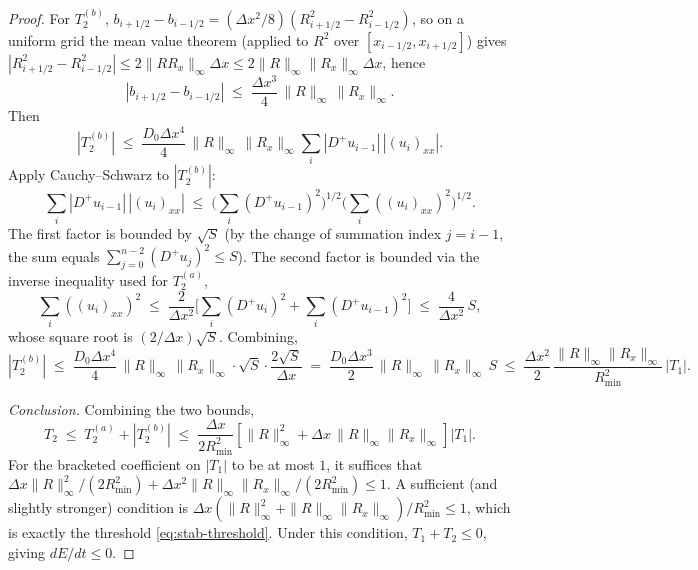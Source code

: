 \documentclass[10pt,a4paper]{amsart}
\begin{document}
\begin{proof}
    For $T_2^{(b)}$, $b_{i+1/2} - b_{i-1/2} = (\Delta x^2/8)(R_{i+1/2}^2 - R_{i-1/2}^2)$, so on a uniform grid the mean value theorem (applied to $R^2$ over $[x_{i-1/2}, x_{i+1/2}]$) gives $|R_{i+1/2}^2 - R_{i-1/2}^2| \leq 2 \|R R_x\|_\infty \Delta x \leq 2\|R\|_\infty \|R_x\|_\infty \Delta x$, hence
    \begin{equation}
        |b_{i+1/2} - b_{i-1/2}| \;\leq\; \frac{\Delta x^3}{4}\, \|R\|_\infty\, \|R_x\|_\infty.
    \end{equation}
    Then
    \begin{equation}
        |T_2^{(b)}| \;\leq\; \frac{D_0 \Delta x^4}{4}\, \|R\|_\infty\, \|R_x\|_\infty \sum_i |D^+ u_{i-1}|\, |(u_i)_{xx}|.
    \end{equation}
    Apply Cauchy--Schwarz to $|T_2^{(b)}|$:
    \begin{equation}
        \sum_i |D^+ u_{i-1}|\, |(u_i)_{xx}| \;\leq\; \bigg(\sum_i (D^+ u_{i-1})^2\bigg)^{1/2} \bigg(\sum_i ((u_i)_{xx})^2\bigg)^{1/2}.
    \end{equation}
    The first factor is bounded by $\sqrt{S}$ (by the change of summation index $j = i-1$, the sum equals $\sum_{j=0}^{n-2}(D^+ u_j)^2 \leq S$). The second factor is bounded via the inverse inequality used for $T_2^{(a)}$,
    \begin{equation}
        \sum_i ((u_i)_{xx})^2 \;\leq\; \frac{2}{\Delta x^2} \bigg[\sum_i (D^+ u_i)^2 + \sum_i (D^+ u_{i-1})^2\bigg] \;\leq\; \frac{4}{\Delta x^2}\, S,
    \end{equation}
    whose square root is $(2/\Delta x)\sqrt{S}$. Combining,
    \begin{equation}
        |T_2^{(b)}| \;\leq\; \frac{D_0 \Delta x^4}{4}\, \|R\|_\infty\, \|R_x\|_\infty \cdot \sqrt{S} \cdot \frac{2\sqrt{S}}{\Delta x} \;=\; \frac{D_0 \Delta x^3}{2}\, \|R\|_\infty\, \|R_x\|_\infty\, S \;\leq\; \frac{\Delta x^2}{2}\, \frac{\|R\|_\infty \|R_x\|_\infty}{R_{\min}^2}\, |T_1|.
    \end{equation}

    \emph{Conclusion.} Combining the two bounds,
    \begin{equation}
        T_2 \;\leq\; T_2^{(a)} + |T_2^{(b)}| \;\leq\; \frac{\Delta x}{2 R_{\min}^2} \left[ \|R\|_\infty^2 + \Delta x\, \|R\|_\infty \|R_x\|_\infty \right] |T_1|.
    \end{equation}
    For the bracketed coefficient on $|T_1|$ to be at most $1$, it suffices that \newline $\Delta x \|R\|_\infty^2/(2 R_{\min}^2) + \Delta x^2 \|R\|_\infty \|R_x\|_\infty/(2 R_{\min}^2) \leq 1$. A sufficient (and slightly stronger) condition is $\Delta x (\|R\|_\infty^2 + \|R\|_\infty \|R_x\|_\infty)/R_{\min}^2 \leq 1$, which is exactly the threshold \eqref{eq:stab-threshold}. Under this condition, $T_1 + T_2 \leq 0$, giving $dE/dt \leq 0$.
\end{proof}
\end{document}
